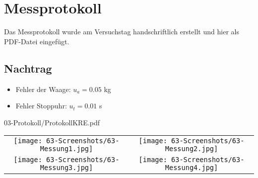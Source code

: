 

\def\skalierung{0.65}

\chapter{Messprotokoll}
\label{chap:protokoll}

Das Messprotokoll wurde am Versuchstag handschriftlich erstellt und hier als
PDF-Datei eingefügt.
\section*{Nachtrag}
\begin{itemize}
    \item Fehler der Waage: $u_a=0.05$ kg
    \item Fehler Stoppuhr: $u_t=0.01$ s
\end{itemize}

%

            {03-Protokoll/ProtokollKRE.pdf}

\begin{center}
    \begin{tabular}{c c}
        \texttt{[image: 63-Screenshots/63-Messung1.jpg]} \hspace{0.5cm} & \hspace{0.5cm} \texttt{[image: 63-Screenshots/63-Messung2.jpg]}\\[0.5cm]            
        \texttt{[image: 63-Screenshots/63-Messung3.jpg]} \hspace{0.5cm} & \hspace{0.5cm} \texttt{[image: 63-Screenshots/63-Messung4.jpg]}            
    \end{tabular}
\end{center}